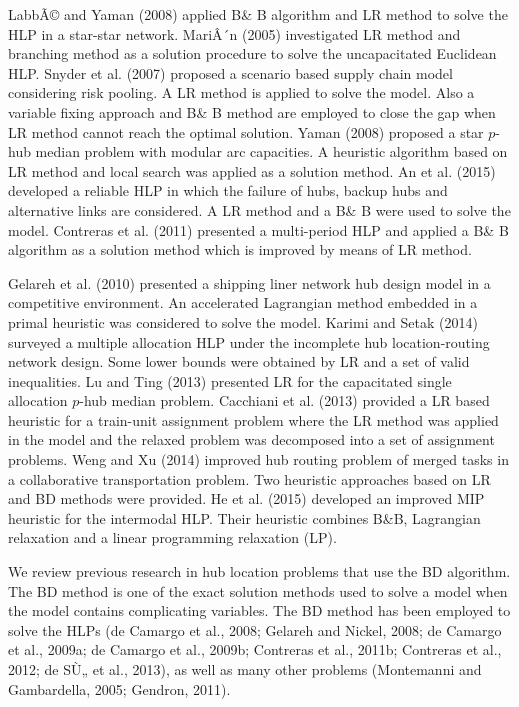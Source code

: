 \documentclass[review]{elsarticle}
\begin{document}
LabbÃ© and Yaman (2008) applied B\& B algorithm and LR method to solve the HLP in a star-star network. MariÂ´n (2005) investigated LR method and branching method as a solution procedure to solve the uncapacitated Euclidean HLP. Snyder et al. (2007) proposed a scenario based supply chain model considering risk pooling. A LR method is applied to solve the model. Also a variable fixing approach and B\& B method are employed to close the gap when LR method cannot reach the optimal solution. Yaman (2008) proposed a star $p$-hub median problem with modular arc capacities. A heuristic algorithm based on LR method and local search was applied as a solution method. An et al. (2015) developed a reliable HLP in which the failure of hubs, backup hubs and alternative links are considered. A LR method and a B\& B were used to solve the model. Contreras et al. (2011) presented a multi-period HLP and applied a B\& B algorithm as a solution method which is improved by means of LR method.

Gelareh et al. (2010) presented a shipping liner network hub design model in a competitive environment. An accelerated Lagrangian method embedded in a primal heuristic was considered to solve the model. Karimi and Setak (2014) surveyed a multiple allocation HLP under the incomplete hub location-routing network design. Some lower bounds were obtained by LR and a set of valid inequalities. Lu and Ting (2013) presented LR for the capacitated single allocation $p$-hub median problem. Cacchiani et al. (2013) provided a LR based heuristic for a train-unit assignment problem where the LR method was applied in the model and the relaxed problem was decomposed into a set of assignment problems. Weng and Xu (2014) improved hub routing problem of merged tasks in a collaborative transportation problem. Two heuristic approaches based on LR and BD methods were provided. He et al. (2015) developed an improved MIP heuristic for the intermodal HLP. Their heuristic combines B\&B, Lagrangian relaxation and a linear programming relaxation (LP).

We review previous research in hub location problems that use the BD algorithm. The BD method is one of the exact solution methods used to solve a model when the model contains complicating variables. The BD method has been employed to solve the HLPs (de Camargo et al., 2008; Gelareh and Nickel, 2008; de Camargo et al., 2009a; de Camargo et al., 2009b; Contreras et al., 2011b; Contreras et al., 2012; de SÙ„ et al., 2013), as well as many other problems (Montemanni and Gambardella, 2005; Gendron, 2011). 
\end{document}
